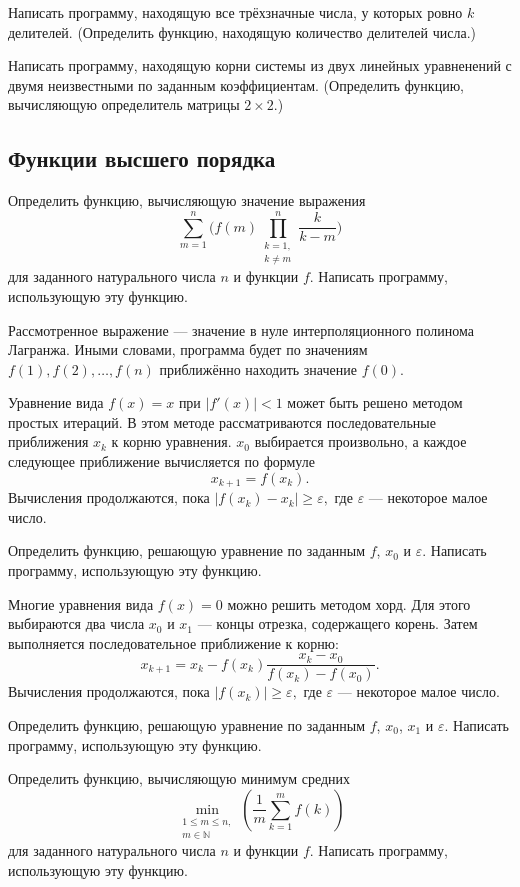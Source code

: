\task Написать программу, находящую все трёхзначные числа, у которых
ровно $k$ делителей. (Определить функцию, находящую количество
делителей числа.)

\task Написать программу, находящую корни системы из двух линейных
уравненений с двумя неизвестными по заданным
коэффициентам. (Определить функцию, вычисляющую определитель матрицы
$2\times 2.$)


\subsection{Функции высшего порядка}

\task Определить функцию, вычисляющую значение выражения
\[
\sum_{m=1}^n\bigg(
f(m)
\prod_{\substack{k=1,\\k\neq m}}^n
\frac{k}{k-m}
\bigg)
\]
для заданного натурального числа $n$ и функции $f.$ Написать
программу, использующую эту функцию.

Рассмотренное выражение — значение в нуле интерполяционного полинома
Лагранжа. Иными словами, программа будет по значениям
$f(1), f(2), \dots, f(n)$ приближённо находить значение $f(0).$

\task Уравнение вида $f(x)=x$ при $|f'(x)|<1$ может быть решено
методом простых итераций. В этом методе рассматриваются
последовательные приближения $x_k$ к корню уравнения. $x_0$ выбирается
произвольно, а каждое следующее приближение вычисляется по формуле
\[
x_{k+1} = f(x_k).
\]
Вычисления продолжаются, пока $|f(x_k) - x_k| \geqslant \varepsilon,$
где $\varepsilon$ — некоторое малое число.

Определить функцию, решающую уравнение по заданным $f$, $x_0$ и
$\varepsilon.$ Написать программу, использующую эту функцию.

\task Многие уравнения вида $f(x)=0$ можно решить методом хорд. Для
этого выбираются два числа $x_0$ и $x_1$ — концы отрезка, содержащего
корень. Затем выполняется последовательное приближение к корню:
\[
x_{k+1} = x_k - f(x_k)\frac{x_k - x_0}{f(x_k) - f(x_0)}.
\] 
Вычисления продолжаются, пока $|f(x_k)| \geqslant \varepsilon,$
где $\varepsilon$ — некоторое малое число.

Определить функцию, решающую уравнение по заданным $f$, $x_0$, $x_1$ и
$\varepsilon.$ Написать программу, использующую эту функцию.

\task Определить функцию, вычисляющую минимум средних
\[
\min_{\substack{1\leqslant m\leqslant n,\\ m\in\mathbb{N}}}
\left(
\frac{1}{m}\sum_{k=1}^{m} f(k)
\right)
\]
для заданного натурального числа $n$ и функции $f.$ Написать
программу, использующую эту функцию.

